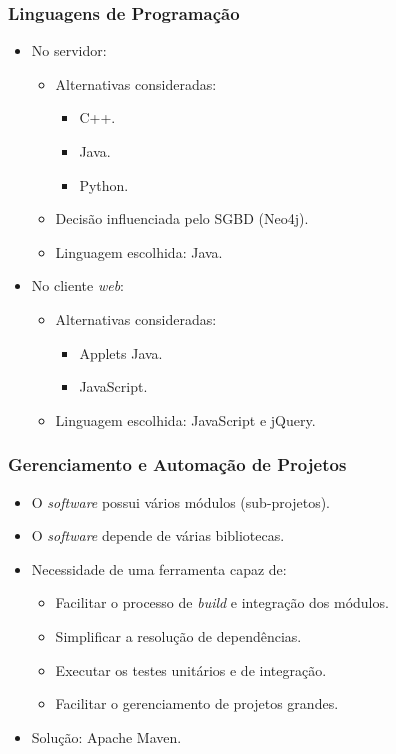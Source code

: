 \frame
{
\frametitle{Linguagens de Programação}
\begin{itemize}
	\item No servidor:
	\begin{itemize}
		\item Alternativas consideradas:
		\begin{itemize}
			\item C++.
			\item Java.
			\item Python.
		\end{itemize}
		\item Decisão influenciada pelo SGBD (Neo4j).
		\item Linguagem escolhida: Java.
	\end{itemize}
	\item No cliente \emph{web}:
	\begin{itemize}
		\item Alternativas consideradas:
		\begin{itemize}
			\item Applets Java.
			\item JavaScript.
		\end{itemize}
		\item Linguagem escolhida: JavaScript e jQuery.
	\end{itemize}
\end{itemize}
}

\frame
{
\frametitle{Gerenciamento e Automação de Projetos}
	\begin{itemize}
		\item O \emph{software} possui vários módulos (sub-projetos).
		\item O \emph{software} depende de várias bibliotecas.
		\item Necessidade de uma ferramenta capaz de:
		\begin{itemize}
			\item Facilitar o processo de \emph{build} e integração dos módulos.
			\item Simplificar a resolução de dependências.
			\item Executar os testes unitários e de integração.
			\item Facilitar o gerenciamento de projetos grandes.
		\end{itemize}
		\item Solução: Apache Maven.
	\end{itemize}
}

